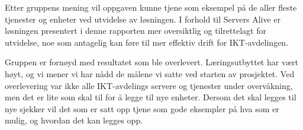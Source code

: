 Etter gruppens mening vil oppgaven kunne tjene som eksempel på de aller fleste tjenester og enheter ved utvidelse av løsningen. I forhold til Servers Alive er løsningen presentert i denne rapporten mer oversiktlig og tilrettelagt for utvidelse, noe som antagelig kan føre til mer effektiv drift for IKT-avdelingen.

Gruppen er fornøyd med resultatet som ble overlevert. Læringsutbyttet har vært høyt, og vi mener vi har nådd de målene vi satte ved starten av prosjektet. Ved overlevering var ikke alle IKT-avdelings servere og tjenester under overvåkning, men det er lite som skal til for å legge til nye enheter. Dersom det skal legges til nye sjekker vil det som er satt opp tjene som gode eksempler på hva som er mulig, og hvordan det kan legges opp.
